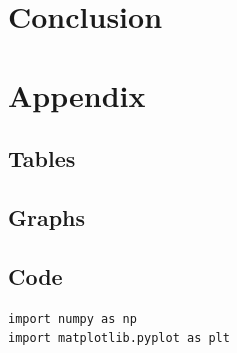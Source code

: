 \documentclass[12pt]{article}
\begin{document}
\newpage

\section{Conclusion} \label{sec:4}



\newpage



 \label{sec:ref}

\vspace{1.5cm}

\listoffigures

\listoftables

\section*{Appendix} \label{sec:A}

\subsection*{Tables}



\subsection*{Graphs}



\subsection*{Code}

%

\begin{minipage}{\linewidth}
\captionsetup{hypcap=false}

\begin{mintedbox}
\begin{verbatim}
import numpy as np
import matplotlib.pyplot as plt


\end{verbatim}
\end{mintedbox}

\end{minipage}
\end{document}
